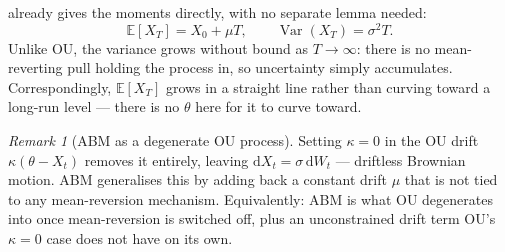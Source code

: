 \documentclass[11pt]{article}
\newcommand{\E}{\mathbb{E}}
\newcommand{\Var}{\operatorname{Var}}
\newcommand{\dd}{\mathrm{d}}
\newcommand{\dW}{\dd W_t}
\theoremstyle{plain}
\theoremstyle{definition}
\theoremstyle{remark}
\newtheorem{remark}{Remark}
\begin{document}
 already gives the moments directly, with no
separate lemma needed:
\[
   \E[X_T] = X_0+\mu T, \qquad \Var(X_T) = \sigma^2 T.
\]
Unlike OU, the variance grows without bound as $T\to\infty$: there is
no mean-reverting pull holding the process in, so uncertainty simply
accumulates. Correspondingly, $\E[X_T]$ grows in a straight line
rather than curving toward a long-run level --- there is no $\theta$
here for it to curve toward.

\begin{remark}[ABM as a degenerate OU process]
Setting $\kappa=0$ in the OU drift $\kappa(\theta-X_t)$ removes it
entirely, leaving $\dd X_t=\sigma\,\dW$ --- driftless Brownian motion.
ABM generalises this by adding back a constant drift $\mu$ that is
not tied to any mean-reversion mechanism. Equivalently: ABM is
what OU degenerates into once mean-reversion is switched off, plus an
unconstrained drift term OU's $\kappa=0$ case does not have on its
own.
\end{remark}



\end{document}
